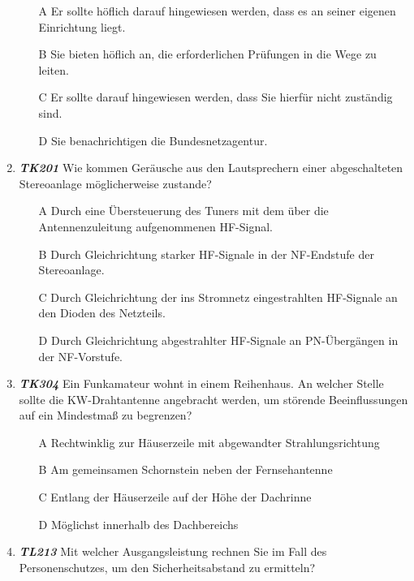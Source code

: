 \begin{enumerate}
	\begin{enumerate}
	\itemsep1pt\parskip0pt
		\item[A] Er sollte höflich darauf hingewiesen werden, dass es an seiner eigenen Einrichtung liegt.
		\item[B] Sie bieten höflich an, die erforderlichen Prüfungen in die Wege zu leiten.
		\item[C] Er sollte darauf hingewiesen werden, dass Sie hierfür nicht zuständig sind.
		\item[D] Sie benachrichtigen die Bundesnetzagentur.
		\end{enumerate}
	\item \emph{\textbf{TK201}}  Wie kommen Geräusche aus den Lautsprechern einer abgeschalteten Stereoanlage möglicherweise zustande?
	\begin{enumerate}
	\itemsep1pt\parskip0pt
		\item[A] Durch eine Übersteuerung des Tuners mit dem über die Antennenzuleitung aufgenommenen HF-Signal.
		\item[B] Durch Gleichrichtung starker HF-Signale in der NF-Endstufe der Stereoanlage.
		\item[C]  Durch Gleichrichtung der ins Stromnetz eingestrahlten HF-Signale an den Dioden des Netzteils.
		\item[D] Durch Gleichrichtung abgestrahlter HF-Signale an PN-Übergängen in der NF-Vorstufe.
		\end{enumerate}
	\item \emph{\textbf{TK304}} Ein Funkamateur wohnt in einem Reihenhaus. An welcher Stelle sollte die KW-Drahtantenne angebracht werden, um störende Beeinflussungen auf ein Mindestmaß zu begrenzen?
	\begin{enumerate}
	\itemsep1pt\parskip0pt
		\item[A] Rechtwinklig zur Häuserzeile mit abgewandter Strahlungsrichtung
		\item[B] Am gemeinsamen Schornstein neben der Fernsehantenne
		\item[C]  Entlang der Häuserzeile auf der Höhe der Dachrinne
		\item[D]  Möglichst innerhalb des Dachbereichs
		\end{enumerate}	
	\item \emph{\textbf{TL213}}  Mit welcher Ausgangsleistung rechnen Sie im Fall des Personenschutzes, um den Sicherheitsabstand zu ermitteln?
	\begin{enumerate}

\end{enumerate}
\end{enumerate}
